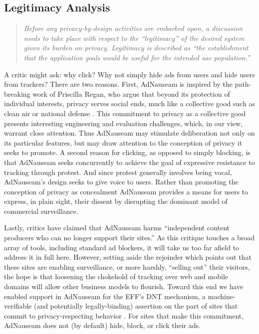 \documentclass[conference]{IEEEtran}
\begin{document}
\subsection{Legitimacy Analysis}

\vspace{1mm}
\blockquote{\emph{Before any privacy-by-design activities are embarked upon, a discussion needs to take place with respect to the “legitimacy” of the desired system given its burden on privacy. Legitimacy is described as “the establishment that the application goals would be useful for the intended use population.”}\cite{Iachello}\cite{Gurses-1}}
\vspace{1mm}

\noindent A critic might ask: why click? Why not simply hide ads from users and hide users from trackers? There are two reasons. First, AdNauseam is inspired by the path-breaking work of Priscilla Regan, who argue that beyond its protection of individual interests, privacy serves social ends, much like a collective good such as clean air or national defense \cite{Regan}. This commitment to privacy as a collective good presents interesting engineering and evaluation challenges, which, in our view, warrant close attention. Thus AdNauseam may stimulate deliberation not only on its particular features, but may draw attention to the conception of privacy it seeks to promote. A second reason for clicking, as opposed to simply blocking, is that AdNauseam seeks concurrently to achieve the goal of expressive resistance to tracking through protest. And since protest generally involves being vocal, AdNauseam's design seeks to give voice to users. Rather than promoting the conception of privacy as concealment AdNauseam provides a means for users to express, in plain sight, their dissent by disrupting the dominant model of commercial surveillance.

Lastly, critics have claimed that AdNauseam harms “independent content producers who can no longer support their sites.” As this critique touches a broad array of tools, including standard ad blockers, it will take us too far afield to address it in full here. However, setting aside the rejoinder which points out that these sites are enabling surveillance, or more harshly, “selling out” their visitors, the hope is that loosening the chokehold of tracking over web and mobile domains will allow other business models to flourish. Toward this end we have enabled support in AdNauseam for the EFF's DNT mechanism, a machine-verifiable (and potentially legally-binding) assertion on the part of sites that commit to privacy-respecting behavior \cite{EFF-1}. For sites that make this commitment, AdNauseam does not (by default) hide, block, or click their ads.
\end{document}
